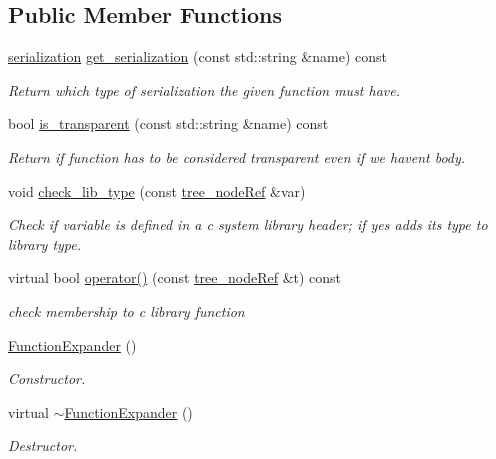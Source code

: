 \subsection*{Public Member Functions}
\begin{DoxyCompactItemize}
\item 
\hyperlink{classFunctionExpander_a2b421dee6238b8f68b6ab29b87bc00d0}{serialization} \hyperlink{classFunctionExpander_a33dd15431d0a654915983727430115fb}{get\+\_\+serialization} (const std\+::string \&name) const
\begin{DoxyCompactList}\small\item\em Return which type of serialization the given function must have. \end{DoxyCompactList}\item 
bool \hyperlink{classFunctionExpander_a948db456fe34454cd36aae396f30241a}{is\+\_\+transparent} (const std\+::string \&name) const
\begin{DoxyCompactList}\small\item\em Return if function has to be considered transparent even if we haven\textquotesingle{}t body. \end{DoxyCompactList}\item 
void \hyperlink{classFunctionExpander_aff5d724386bc6bda3ceb080d8b20889d}{check\+\_\+lib\+\_\+type} (const \hyperlink{tree__node_8hpp_a6ee377554d1c4871ad66a337eaa67fd5}{tree\+\_\+node\+Ref} \&var)
\begin{DoxyCompactList}\small\item\em Check if variable is defined in a c system library header; if yes adds its type to library type. \end{DoxyCompactList}\item 
virtual bool \hyperlink{classFunctionExpander_a23c129a748b0eee89b666bf056162750}{operator()} (const \hyperlink{tree__node_8hpp_a6ee377554d1c4871ad66a337eaa67fd5}{tree\+\_\+node\+Ref} \&t) const
\begin{DoxyCompactList}\small\item\em check membership to c library function \end{DoxyCompactList}\item 
\hyperlink{classFunctionExpander_a60b78226d9dafb0699a53eaea11dd882}{Function\+Expander} ()
\begin{DoxyCompactList}\small\item\em Constructor. \end{DoxyCompactList}\item 
virtual \hyperlink{classFunctionExpander_aacb59907fe75209a0d72b46de85bc642}{$\sim$\+Function\+Expander} ()
\begin{DoxyCompactList}\small\item\em Destructor. \end{DoxyCompactList}\end{DoxyCompactItemize}
